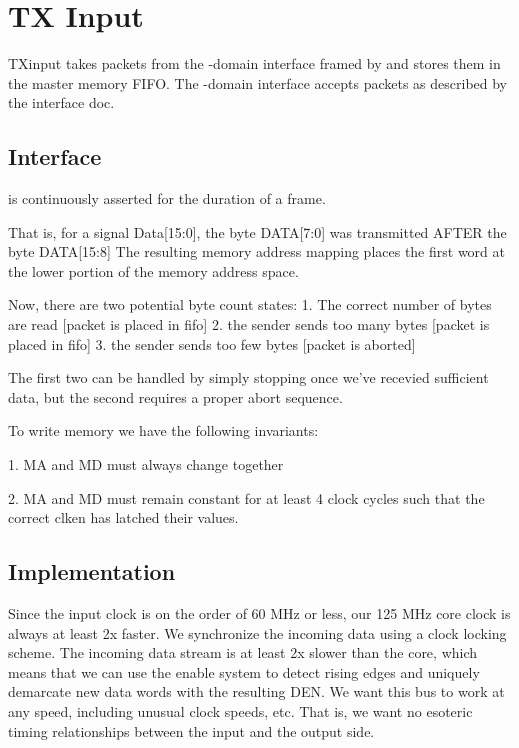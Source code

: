 \section{TX Input}

TXinput takes packets from the -domain interface framed
by  and stores them in the master memory FIFO. The
-domain interface accepts packets as described by the
interface doc.

\subsection{Interface}
 is continuously asserted for the duration of a frame. 

That is, for a signal Data[15:0], the byte DATA[7:0] was transmitted
AFTER the byte DATA[15:8] The resulting memory address mapping places
the first word at the lower portion of the memory address space.

Now, there are two potential byte count states:
1. The correct number of bytes are read [packet is placed in fifo]
2. the sender sends too many bytes [packet is placed in fifo]
3. the sender sends too few bytes [packet is aborted]

The first two can be handled by simply stopping once we've recevied
sufficient data, but the second requires a proper abort sequence.

To write memory we have the following invariants:

1. MA and MD must always change together

2. MA and MD must remain constant for at least 4 clock cycles such
   that the correct clken has latched their values.


\subsection{Implementation}


Since the input clock is on the order of 60 MHz or less, our 125 MHz
core clock is always at least 2x faster. We synchronize the incoming
data using a clock locking scheme. The incoming data stream is at
least 2x slower than the core, which means that we can use the enable system
to detect rising edges and uniquely demarcate new data words with the
resulting DEN. We want this bus to work at any speed, including
unusual clock speeds, etc. That is, we want no esoteric timing
relationships between the input and the output side.

